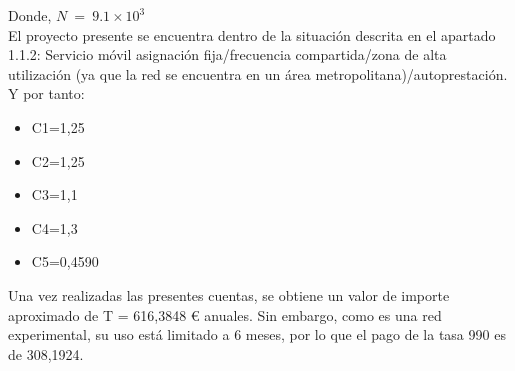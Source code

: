 Donde, $N\ =\ 9.1 \times 10^3$\\
El proyecto presente se encuentra dentro de la situación descrita en el apartado 1.1.2: Servicio móvil asignación fija/frecuencia compartida/zona de alta utilización (ya que la red se encuentra en un área metropolitana)/autoprestación. Y por tanto: 
\begin{itemize}
\item C1=1,25
\item C2=1,25
\item C3=1,1
\item C4=1,3
\item C5=0,4590
\end{itemize}


Una vez realizadas las presentes cuentas, se obtiene un valor de importe aproximado de T = 616,3848 \euro{} anuales. Sin embargo, como es una red experimental, su uso está limitado a 6 meses, por lo que el pago de la tasa 990 es de 308,1924. 
